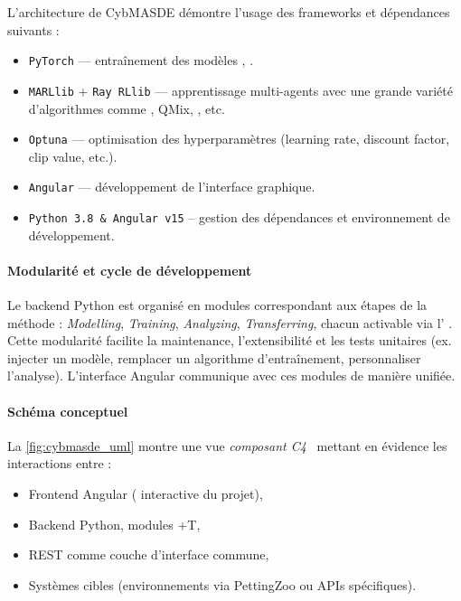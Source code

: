 L’architecture de CybMASDE démontre l’usage des frameworks et dépendances suivants :
\begin{itemize}
    \item \texttt{PyTorch} — entraînement des modèles , .
    \item \texttt{MARLlib} + \texttt{Ray RLlib} — apprentissage multi-agents avec une grande variété d'algorithmes comme , QMix, , etc.
    \item \texttt{Optuna} — optimisation des hyperparamètres (learning rate, discount factor,  clip value, etc.).
    \item \texttt{Angular} — développement de l’interface graphique.
    \item \texttt{Python 3.8 \& Angular v15} -- gestion des dépendances et environnement de développement.
\end{itemize}



\paragraph{Modularité et cycle de développement}
Le backend Python est organisé en modules correspondant aux étapes de la méthode  :
\textit{Modelling}, \textit{Training}, \textit{Analyzing}, \textit{Transferring}, chacun activable via l’ .
Cette modularité facilite la maintenance, l’extensibilité et les tests unitaires (ex. injecter un modèle, remplacer un algorithme d’entraînement, personnaliser l’analyse). L’interface Angular communique avec ces modules de manière unifiée.

\paragraph{Schéma conceptuel}
La \autoref{fig:cybmasde_uml} montre une vue \textit{composant C4}~\cite{richards2019fundamentals} mettant en évidence les interactions entre :
\begin{itemize}
    \item \textsf{Frontend Angular} ( interactive du projet),
    \item \textsf{Backend Python}, modules +T,
    \item \textsf{ REST} comme couche d’interface commune,
    \item \textsf{Systèmes cibles} (environnements via PettingZoo ou APIs spécifiques).
\end{itemize}

